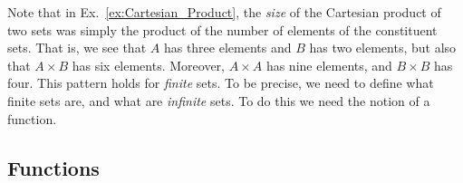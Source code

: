 \documentclass[crop=false,class=book,oneside]{standalone}
\begin{document}
                Note that in Ex.~\ref{ex:Cartesian_Product}, the
                \textit{size} of the Cartesian product of two sets
                was simply the product of the number of elements of
                the constituent sets. That is, we see that $A$ has
                three elements and $B$ has two elements, but also
                that $A\times{B}$ has six elements. Moreover,
                $A\times{A}$ has nine elements, and $B\times{B}$ has
                four. This pattern holds for \textit{finite} sets.
                To be precise, we need to define what finite sets
                are, and what are \textit{infinite} sets. To do
                this we need the notion of a function.
        \subsection{Functions}
\end{document}
